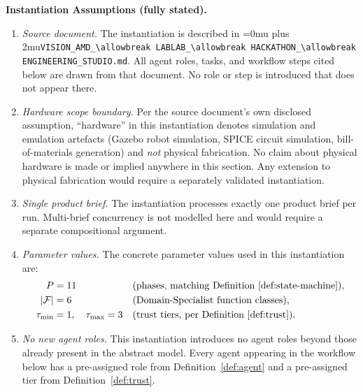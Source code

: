 \documentclass[12pt]{article}
\theoremstyle{definition}
\DeclareRobustCommand{\code}[1]{\begingroup\Urlmuskip=0mu plus 2mu\relax\nolinkurl{#1}\endgroup}
\newcommand{\VisionHackathon}{\code{VISION\_AMD\_\allowbreak LABLAB\_\allowbreak HACKATHON\_\allowbreak ENGINEERING\_STUDIO.md}}
\begin{document}
\medskip
\noindent\textbf{Instantiation Assumptions (fully stated).}
\begin{enumerate}
    \item[A1] \emph{Source document.}  The instantiation is described in
              \VisionHackathon{}.  All agent roles, tasks, and
              workflow steps cited below are drawn from that document.
              No role or step is introduced that does not appear there.

    \item[A2] \emph{Hardware scope boundary.}  Per the source document's
              own disclosed assumption, ``hardware'' in this instantiation
              denotes simulation and emulation artefacts (Gazebo robot
              simulation, SPICE circuit simulation, bill-of-materials
              generation) and \emph{not} physical fabrication.  No claim
              about physical hardware is made or implied anywhere in this
              section.  Any extension to physical fabrication would
              require a separately validated instantiation.

    \item[A3] \emph{Single product brief.}  The instantiation processes
              exactly one product brief per run.  Multi-brief concurrency
              is not modelled here and would require a separate
              compositional argument.

    \item[A4] \emph{Parameter values.}  The concrete parameter values
              used in this instantiation are:
              \begin{align}
                  P       &= 11
                  &&\text{(phases, matching Definition~\ref{def:state-machine})},
                  \notag\\
                  |\mathcal{F}| &= 6
                  &&\text{(Domain-Specialist function classes)},
                  \notag\\
                  \tau_{\mathrm{min}} &= 1,\quad \tau_{\mathrm{max}} = 3
                  &&\text{(trust tiers, per Definition~\ref{def:trust})}.
                  \notag
              \end{align}

    \item[A5] \emph{No new agent roles.}  This instantiation introduces
              no agent roles beyond those already present in the abstract
              model.  Every agent appearing in the workflow below has a
              pre-assigned role from Definition~\ref{def:agent} and a
              pre-assigned tier from Definition~\ref{def:trust}.
\end{enumerate}
\end{document}
